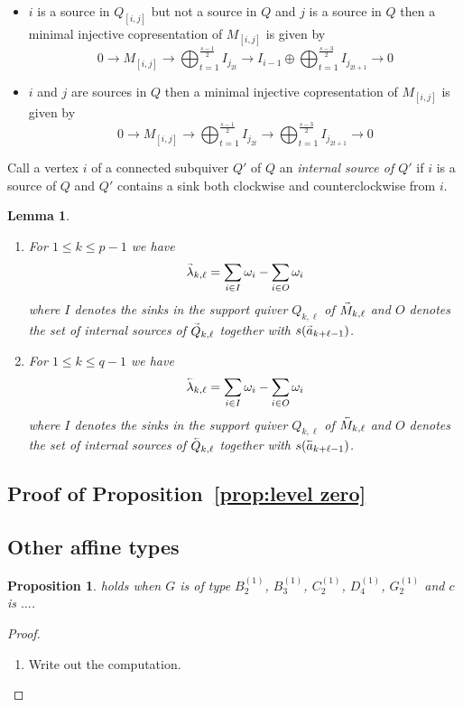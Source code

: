 \documentclass[12pt]{amsart}
\renewcommand{\vec}[1]{\accentset{\shortrightarrow}{#1}}
\newcommand{\cev}[1]{\accentset{\shortleftarrow}{#1}}
\newtheorem{lemma}[theorem]{Lemma}
\newtheorem{proposition}[theorem]{Proposition}
\numberwithin{equation}{section}
\begin{document}
\begin{itemize}
    \item $i$ is a source in $Q_{[i,j]}$ but not a source in $Q$ and $j$ is a source in $Q$ then a minimal injective copresentation of $M_{[i,j]}$ is given by
    \[0\longrightarrow M_{[i,j]}\longrightarrow\bigoplus_{t=1}^{\frac{s-1}{2}} I_{j_{2t}}\longrightarrow I_{i-1}\oplus\bigoplus_{t=1}^{\frac{s-3}{2}} I_{j_{2t+1}}\longrightarrow0\]
    \item $i$ and $j$ are sources in $Q$ then a minimal injective copresentation of $M_{[i,j]}$ is given by
    \[0\longrightarrow M_{[i,j]}\longrightarrow\bigoplus_{t=1}^{\frac{s-1}{2}} I_{j_{2t}}\longrightarrow\bigoplus_{t=1}^{\frac{s-3}{2}} I_{j_{2t+1}}\longrightarrow0\]
  \end{itemize}

  Call a vertex $i$ of a connected subquiver $Q'$ of $Q$ an \emph{internal source of $Q'$} if $i$ is a source of $Q$ and $Q'$ contains a sink both clockwise and counterclockwise from $i$.
  \begin{lemma}\mbox{}
    \begin{enumerate}
      \item For $1\le k\le p-1$ we have
      \[\vec{\lambda}_{k,\ell}=\sum_{i\in I}\omega_i-\sum_{i\in O}\omega_i\]
      where $I$ denotes the sinks in the support quiver $Q_{k,\ell}$ of $\vec{M}_{k,\ell}$ and $O$ denotes the set of internal sources of $\vec{Q}_{k,\ell}$ together with $s(\vec{a}_{k+\ell-1})$.
      \item For $1\le k\le q-1$ we have
      \[\cev{\lambda}_{k,\ell}=\sum_{i\in I}\omega_i-\sum_{i\in O}\omega_i\]
      where $I$ denotes the sinks in the support quiver $Q_{k,\ell}$ of $\cev{M}_{k,\ell}$ and $O$ denotes the set of internal sources of $\cev{Q}_{k,\ell}$ together with $s(\cev{a}_{k+\ell-1})$.
    \end{enumerate}
  \end{lemma}

\subsection{Proof of Proposition~\ref{prop:level zero}}


\subsection{Other affine types}\label{sec:othertypes}

\begin{proposition}
 holds when $G$ is of type $B_2^{(1)}$, $B_3^{(1)}$, $C_2^{(1)}$, $D_4^{(1)}$, $G_2^{(1)}$ and $c$ is $\dotsc$. 
\end{proposition}
\begin{proof}
\begin{enumerate}
\item Write out the computation.
\end{enumerate}
\end{proof}
\end{document}
